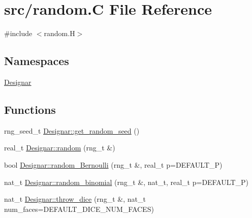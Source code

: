 \hypertarget{random_8_c}{}\section{src/random.C File Reference}
\label{random_8_c}
{\ttfamily \#include $<$random.\+H$>$}\newline
\subsection*{Namespaces}
\begin{DoxyCompactItemize}
\item 
 \hyperlink{namespace_designar}{Designar}
\end{DoxyCompactItemize}
\subsection*{Functions}
\begin{DoxyCompactItemize}
\item 
rng\+\_\+seed\+\_\+t \hyperlink{namespace_designar_a39f540907bf568cf8e9983cffbc5246c}{Designar\+::get\+\_\+random\+\_\+seed} ()
\item 
real\+\_\+t \hyperlink{namespace_designar_ae380ee144e16364a26bec38110ac58cc}{Designar\+::random} (rng\+\_\+t \&)
\item 
bool \hyperlink{namespace_designar_adf6febbe5fa0abe44ea554203b767685}{Designar\+::random\+\_\+\+Bernoulli} (rng\+\_\+t \&, real\+\_\+t p=D\+E\+F\+A\+U\+L\+T\+\_\+P)
\item 
nat\+\_\+t \hyperlink{namespace_designar_a4f786bd2e0e15f81f468cf60b3a1d9fb}{Designar\+::random\+\_\+binomial} (rng\+\_\+t \&, nat\+\_\+t, real\+\_\+t p=D\+E\+F\+A\+U\+L\+T\+\_\+P)
\item 
nat\+\_\+t \hyperlink{namespace_designar_a29b53c8e7dfb33209e0a79ad167b6803}{Designar\+::throw\+\_\+dice} (rng\+\_\+t \&, nat\+\_\+t num\+\_\+faces=D\+E\+F\+A\+U\+L\+T\+\_\+\+D\+I\+C\+E\+\_\+\+N\+U\+M\+\_\+\+F\+A\+C\+ES)
\end{DoxyCompactItemize}
